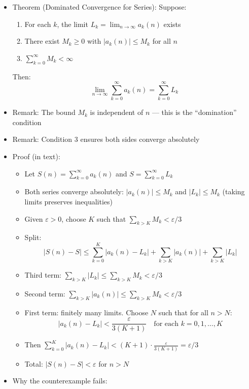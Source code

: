 \documentclass[
  10pt,
  letterpaper,
]{scrbook}
\providecommand{\tightlist}{%
  \setlength{\itemsep}{0pt}\setlength{\parskip}{0pt}}
\begin{document}
\begin{itemize}
\tightlist
\item
  Theorem (Dominated Convergence for Series): Suppose:

  \begin{enumerate}
  \def\labelenumi{\arabic{enumi}.}
  \tightlist
  \item
    For each \(k\), the limit \(L_k = \lim_{n \to \infty} a_k(n)\)
    exists
  \item
    There exist \(M_k \geq 0\) with \(|a_k(n)| \leq M_k\) for all \(n\)
  \item
    \(\sum_{k=0}^{\infty} M_k < \infty\)
  \end{enumerate}

  Then:
  \[\lim_{n \to \infty} \sum_{k=0}^{\infty} a_k(n) = \sum_{k=0}^{\infty} L_k\]
\item
  Remark: The bound \(M_k\) is independent of \(n\) --- this is the
  ``domination'' condition
\item
  Remark: Condition 3 ensures both sides converge absolutely
\item
  Proof (in text):

  \begin{itemize}
  \tightlist
  \item
    Let \(S(n) = \sum_{k=0}^{\infty} a_k(n)\) and
    \(S = \sum_{k=0}^{\infty} L_k\)
  \item
    Both series converge absolutely: \(|a_k(n)| \leq M_k\) and
    \(|L_k| \leq M_k\) (taking limits preserves inequalities)
  \item
    Given \(\varepsilon > 0\), choose \(K\) such that
    \(\sum_{k > K} M_k < \varepsilon/3\)
  \item
    Split:
    \[|S(n) - S| \leq \sum_{k=0}^{K} |a_k(n) - L_k| + \sum_{k > K} |a_k(n)| + \sum_{k > K} |L_k|\]
  \item
    Third term:
    \(\sum_{k > K} |L_k| \leq \sum_{k > K} M_k < \varepsilon/3\)
  \item
    Second term:
    \(\sum_{k > K} |a_k(n)| \leq \sum_{k > K} M_k < \varepsilon/3\)
  \item
    First term: finitely many limits. Choose \(N\) such that for all
    \(n > N\):
    \[|a_k(n) - L_k| < \frac{\varepsilon}{3(K+1)} \quad \text{for each } k = 0, 1, \ldots, K\]
  \item
    Then
    \(\sum_{k=0}^{K} |a_k(n) - L_k| < (K+1) \cdot \frac{\varepsilon}{3(K+1)} = \varepsilon/3\)
  \item
    Total: \(|S(n) - S| < \varepsilon\) for \(n > N\)
  \end{itemize}
\item
  Why the counterexample fails:


\end{itemize}
\end{document}
